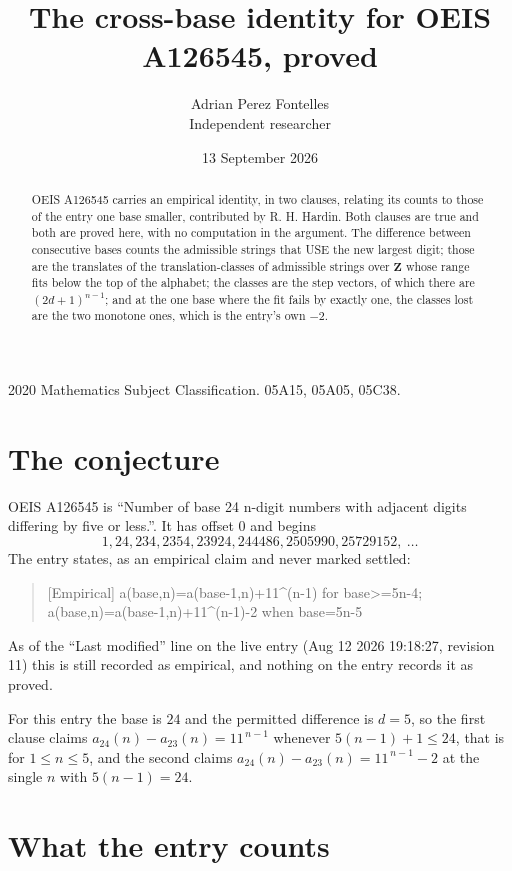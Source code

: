 \documentclass[11pt,a4paper]{article}
\title{The cross-base identity for OEIS A126545, proved}
\author{Adrian Perez Fontelles\\ \small Independent researcher}
\date{13 September 2026}
\theoremstyle{plain}
\theoremstyle{definition}
\begin{document}
\maketitle

\begin{abstract}
OEIS A126545 carries an empirical identity, in two clauses, relating its counts to those of the
entry one base smaller, contributed by R. H. Hardin. Both clauses are true and both are proved
here, with no computation in the argument. The difference between consecutive bases counts the
admissible strings that USE the new largest digit; those are the translates of the
translation-classes of admissible strings over $\mathbf{Z}$ whose range fits below the top of
the alphabet; the classes are the step vectors, of which there are $(2d+1)^{n-1}$; and at the
one base where the fit fails by exactly one, the classes lost are the two monotone ones, which
is the entry's own $-2$.
\end{abstract}

\noindent\small 2020 Mathematics Subject Classification. 05A15, 05A05, 05C38.\normalsize

\section{The conjecture}

OEIS A126545 is ``Number of base 24 n-digit numbers with adjacent digits differing by five or less.''. It has offset $0$ and begins
\[
1, 24, 234, 2354, 23924, 244486, 2505990, 25729152,\ \dots
\]
The entry states, as an empirical claim and never marked settled:
\begin{quote}
[Empirical] a(base,n)=a(base-1,n)+11\textasciicircum{}(n-1) for base>=5n-4; a(base,n)=a(base-1,n)+11\textasciicircum{}(n-1)-2 when base=5n-5
\end{quote}
As of the ``Last modified'' line on the live entry (Aug 12 2026 19:18:27, revision 11)
this is still recorded as empirical, and nothing on the entry records it as proved.

For this entry the base is $24$ and the permitted difference is $d=5$, so the first clause
claims $a_{24}(n)-a_{23}(n)=11^{\,n-1}$ whenever $5(n-1)+1\le24$, that is for
$1\le n\le5$, and the second claims $a_{24}(n)-a_{23}(n)=11^{\,n-1}-2$ at the single
$n$ with $5(n-1)=24$.

\section{What the entry counts}
\end{document}
